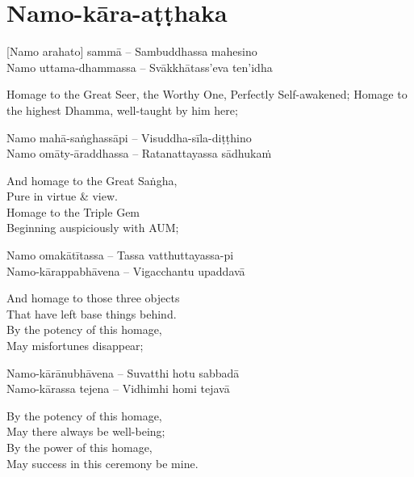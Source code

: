 \suttaRef{[Thai]}

\section{Namo-kāra-aṭṭhaka}
\label{namo-kara-atthaka}

\vspace{-1em}

[Namo arahato] sammā – Sambuddhassa mahesino\\
Namo uttama-dhammassa – Svākkhātass'eva ten'idha

\begin{english-verses}
  Homage to the Great Seer, the Worthy One, Perfectly Self-awakened; Homage to the highest Dhamma, well-taught by him here;
\end{english-verses}

Namo mahā-saṅghassāpi – Visuddha-sīla-diṭṭhino\\
Namo omāty-āraddhassa – Ratanattayassa sādhukaṁ

\begin{english-verses}
  And homage to the Great Saṅgha,\\
  Pure in virtue \& view.\\
  Homage to the Triple Gem\\
  Beginning auspiciously with AUM;
\end{english-verses}

Namo omakātītassa – Tassa vatthuttayassa-pi\\
Namo-kārappabhāvena – Vigacchantu upaddavā\\

\begin{english-verses}
  And homage to those three objects\\
  That have left base things behind.\\
  By the potency of this homage,\\
  May misfortunes disappear;
\end{english-verses}

Namo-kārānubhāvena – Suvatthi hotu sabbadā\\
Namo-kārassa tejena – Vidhimhi homi tejavā

\begin{english-verses}
  By the potency of this homage,\\
  May there always be well-being;\\
  By the power of this homage,\\
  May success in this ceremony be mine.
\end{english-verses}

